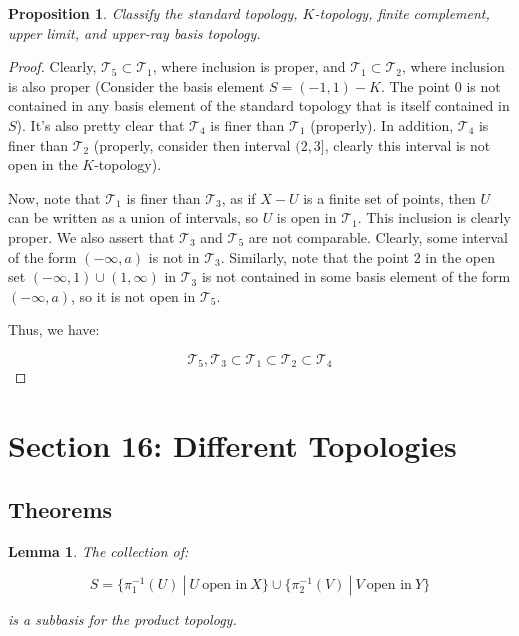 \documentclass[10pt, oneside]{amsart}
\newtheorem{lem}{Lemma}
\newtheorem{prop}{Proposition}
\begin{document}
    \begin{prop}
      Classify the standard topology, $K$-topology, finite complement, upper limit, and upper-ray basis topology.
    \end{prop}

    \begin{proof}
      Clearly, $\mathcal{T}_5 \subset \mathcal{T}_1$, where inclusion is proper, and $\mathcal{T}_1 \subset \mathcal{T}_2$, where inclusion is also proper (Consider the basis element $S = (-1, 1) - K$. The point $0$ is not contained in any basis
      element of the standard topology that is itself contained in $S$). It's also pretty clear that $\mathcal{T}_4$ is finer than $\mathcal{T}_1$ (properly). In addition, $\mathcal{T}_4$ is finer than $\mathcal{T}_2$ (properly, consider then interval $(2, 3]$, clearly
      this interval is not open in the $K$-topology).
      \newline

      Now, note that $\mathcal{T}_1$ is finer than $\mathcal{T}_3$, as if $X - U$ is a finite set of points, then $U$ can be written as a union of intervals, so $U$ is open in $\mathcal{T}_1$. This inclusion is clearly proper.
      We also assert that $\mathcal{T}_3$ and $\mathcal{T}_5$ are not comparable. Clearly, some interval of the form $(-\infty, a)$ is not in $\mathcal{T}_3$. Similarly, note that the point $2$ in the
      open set $(-\infty, 1) \cup (1, \infty)$ in $\mathcal{T}_3$ is not contained in some basis element of the form $(-\infty, a)$, so it is not open in $\mathcal{T}_5$.
      \newline

      Thus, we have:

      $$\mathcal{T}_5, \mathcal{T}_3 \subset \mathcal{T}_1 \subset \mathcal{T}_2 \subset \mathcal{T}_4$$
    \end{proof}

    \section{Section 16: Different Topologies}

    \subsection{Theorems}

    \begin{lem}
    The collection of:

    $$S = \{ \pi_1^{-1}(U) \ | \ U \ \text{open \ in} \ X\} \cup \{ \pi_2^{-1}(V) \ | \ V \ \text{open \ in} \ Y\}$$

    is a subbasis for the product topology.
    \end{lem}
\end{document}
